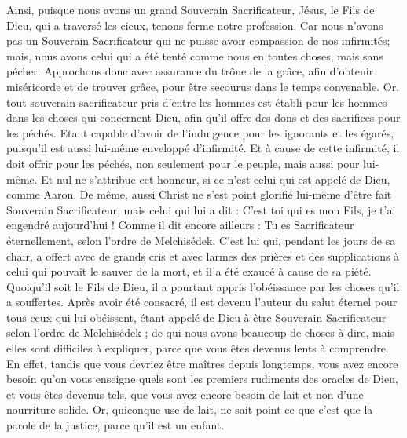 \begin{multicols}{2}
Ainsi, puisque nous avons un grand Souverain Sacrificateur, Jésus, le Fils de Dieu, qui a traversé les cieux, tenons ferme notre profession.
Car nous n'avons pas un Souverain Sacrificateur qui ne puisse avoir compassion de nos infirmités; mais, nous avons celui qui a été tenté comme nous en toutes choses, mais sans pécher.
Approchons donc avec assurance du trône de la grâce, afin d'obtenir miséricorde et de trouver grâce, pour être secourus dans le temps convenable.
\VerseOne{}Or, tout souverain sacrificateur pris d'entre les hommes est établi pour les hommes dans les choses qui concernent Dieu, afin qu'il offre des dons et des sacrifices pour les péchés.
Etant capable d'avoir de l'indulgence pour les ignorants et les égarés, puisqu'il est aussi lui-même enveloppé d'infirmité.
Et à cause de cette infirmité, il doit offrir pour les péchés, non seulement pour le peuple, mais aussi pour lui-même.
Et nul ne s'attribue cet honneur, si ce n'est celui qui est appelé de Dieu, comme Aaron.
De même, aussi Christ ne s'est point glorifié lui-même d'être fait Souverain Sacrificateur, mais celui qui lui a dit : C'est toi qui es mon Fils, je t'ai engendré aujourd'hui !
Comme il dit encore ailleurs : Tu es Sacrificateur éternellement, selon l'ordre de Melchisédek.
C'est lui qui, pendant les jours de sa chair, a offert avec de grands cris et avec larmes des prières et des supplications à celui qui pouvait le sauver de la mort, et il a été exaucé à cause de sa piété.
Quoiqu'il soit le Fils de Dieu, il a pourtant appris l'obéissance par les choses qu'il a souffertes.
Après avoir été consacré, il est devenu l'auteur du salut éternel pour tous ceux qui lui obéissent,
étant appelé de Dieu à être Souverain Sacrificateur selon l'ordre de Melchisédek ;
de qui nous avons beaucoup de choses à dire, mais elles sont difficiles à expliquer, parce que vous êtes devenus lents à comprendre.
En effet, tandis que vous devriez être maîtres depuis longtemps, vous avez encore besoin qu'on vous enseigne quels sont les premiers rudiments des oracles de Dieu, et vous êtes devenus tels, que vous avez encore besoin de lait et non d'une nourriture solide.
Or, quiconque use de lait, ne sait point ce que c'est que la parole de la justice, parce qu'il est un enfant.

\end{multicols}
